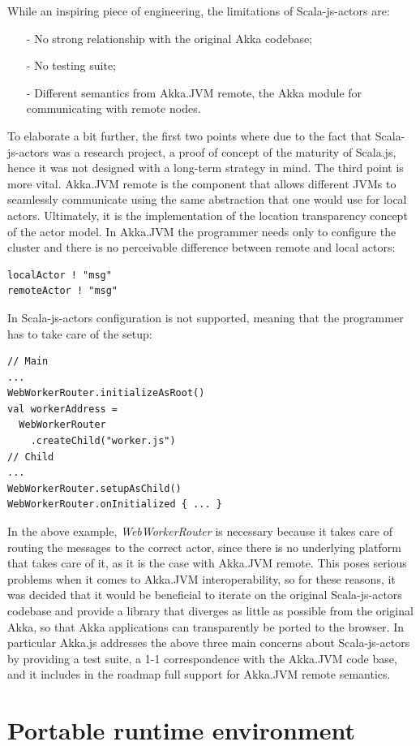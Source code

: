 \documentclass{sig-alternate}
\begin{document}
While an inspiring piece of engineering, the limitations of Scala-js-actors are:
\begin{itemize}
\item[-] No strong relationship with the original Akka codebase;
\item[-] No testing suite;
\item[-] Different semantics from Akka.JVM remote, the Akka module for communicating with remote nodes.
\end{itemize}
To elaborate a bit further, the first two points where due to the fact that Scala-js-actors was a research project, a proof of concept of the maturity of Scala.js, hence it was not designed with a long-term strategy in mind.
The third point is more vital. Akka.JVM remote is the component that allows different JVMs to seamlessly communicate using the same abstraction that one would use for local actors. Ultimately, it is the implementation of the location transparency concept of the actor model.
In Akka.JVM the programmer needs only to configure the cluster and there is no perceivable difference between
remote and local actors:
\begin{lstlisting}
localActor ! "msg"
remoteActor ! "msg"
\end{lstlisting}
In Scala-js-actors configuration is not supported, meaning that the programmer has to take care of the setup:
\begin{lstlisting}
// Main
...
WebWorkerRouter.initializeAsRoot()
val workerAddress =
  WebWorkerRouter
    .createChild("worker.js")
// Child
...
WebWorkerRouter.setupAsChild()
WebWorkerRouter.onInitialized { ... }
\end{lstlisting}
In the above example, \emph{WebWorkerRouter} is necessary because it takes care of routing the messages to the
correct actor, since there is no underlying platform that takes care of it, as it is the case with Akka.JVM remote.
This poses serious problems when it comes to Akka.JVM interoperability, so for these reasons, it was decided
that it would be beneficial to iterate on the original Scala-js-actors codebase and provide a library that
diverges as little as possible from the original Akka, so that Akka applications can transparently be ported to the browser.
In particular Akka.js addresses the above three main concerns about Scala-js-actors by providing a
test suite, a 1-1 correspondence with the Akka.JVM code base, and it includes in the roadmap full support for Akka.JVM remote
semantics.


\section{Portable runtime environment}\label{sec:challenges}
\end{document}
